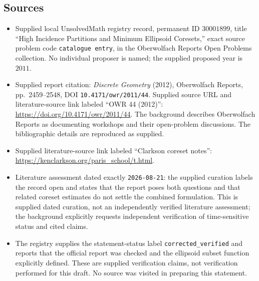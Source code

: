 \documentclass[11pt]{article}
\begin{document}
\subsection{Sources}
\begin{itemize}
\item Supplied local UnsolvedMath registry record, permanent ID \(30001899\), title ``High Incidence Partitions and Minimum Ellipsoid Coresets,'' exact source problem code \texttt{catalogue entry}, in the Oberwolfach Reports Open Problems collection. No individual proposer is named; the supplied proposed year is \(2011\).
\item Supplied report citation: \emph{Discrete Geometry} (2012), Oberwolfach Reports, pp.~2459--2548, DOI \texttt{10.4171/owr/2011/44}. Supplied source URL and literature-source link labeled ``OWR 44 (2012)'': \url{https://doi.org/10.4171/owr/2011/44}. The background describes Oberwolfach Reports as documenting workshops and their open-problem discussions. The bibliographic details are reproduced as supplied.
\item Supplied literature-source link labeled ``Clarkson coreset notes'': \url{https://kenclarkson.org/paris_school/t.html}.
\item Literature assessment dated exactly \texttt{2026-08-21}: the supplied curation labels the record open and states that the report poses both questions and that related coreset estimates do not settle the combined formulation. This is supplied dated curation, not an independently verified literature assessment; the background explicitly requests independent verification of time-sensitive status and cited claims.
\item The registry supplies the statement-status label \texttt{corrected\_verified} and reports that the official report was checked and the ellipsoid subset function explicitly defined. These are supplied verification claims, not verification performed for this draft. No source was visited in preparing this statement.
\end{itemize}
\end{document}

